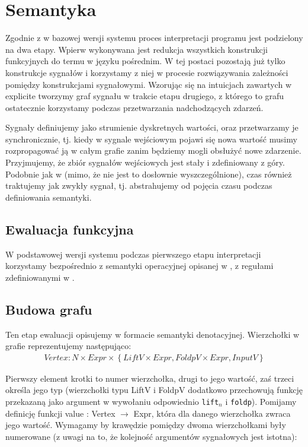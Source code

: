 \documentclass[11pt,leqno]{article}
\begin{document}
\section{Semantyka}

Zgodnie z \cite[p.~3.3]{CC} w bazowej wersji systemu proces interpretacji programu jest podzielony na dwa etapy. Wpierw wykonywana jest redukcja wszystkich konstrukcji funkcyjnych do termu w języku pośrednim. W tej postaci  pozostają już tylko konstrukcje sygnałów i korzystamy z niej w procesie rozwiązywania zależności pomiędzy konstrukcjami sygnałowymi. Wzorując się na intuicjach zawartych w \cite[p.~3.3.2]{CC} explicite tworzymy graf sygnału w trakcie etapu drugiego, z którego to grafu ostatecznie korzystamy podczas przetwarzania nadchodzących zdarzeń.


Sygnały definiujemy jako strumienie dyskretnych wartości, oraz przetwarzamy je synchronicznie, tj. kiedy w sygnale wejściowym pojawi się nowa wartość musimy rozpropagować ją w całym grafie zanim będziemy mogli obsłużyć nowe zdarzenie. Przyjmujemy, że zbiór sygnałów wejściowych jest stały i zdefiniowany z góry. Podobnie jak w \nocite{CC} (mimo, że nie jest to dosłownie wyszczególnione), czas również traktujemy jak zwykły sygnał, tj. abstrahujemy od pojęcia czasu podczas definiowania semantyki.

\subsection{Ewaluacja funkcyjna}

W podstawowej wersji systemu podczas pierwszego etapu interpretacji korzystamy bezpośrednio z semantyki operacyjnej opisanej w \cite[p.~3.3.1]{CC}, z regułami zdefiniowanymi w \cite[fig.~6]{CC}. 

\subsection{Budowa grafu}
Ten etap ewaluacji opisujemy w formacie semantyki denotacyjnej. Wierzchołki w grafie reprezentujemy następująco:
\begin{gather}
Vertex : N \times Expr \times \left\{ {LiftV \times Expr, FoldpV \times Expr, InputV}\right\} 
\end{gather}

Pierwszy element krotki to numer wierzchołka, drugi to jego wartość, zaś trzeci określa jego typ (wierzchołki typu LiftV i FoldpV dodatkowo przechowują funkcję przekazaną jako argument w wywołaniu odpowiednio \texttt{lift$_{n}$} i \texttt{foldp}). Pomijamy definicję funkcji value : Vertex $\rightarrow$ Expr, która dla danego wierzchołka zwraca jego wartość. Wymagamy by krawędzie pomiędzy dwoma wierzchołkami były numerowane (z uwagi na to, że kolejność argumentów sygnałowych jest istotna):
\end{document}
